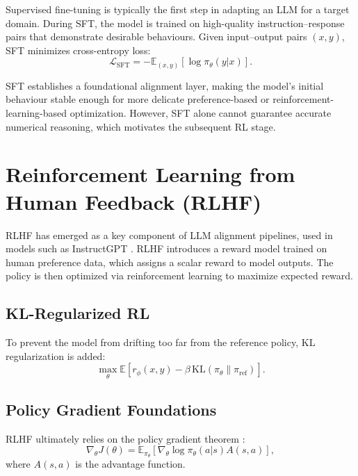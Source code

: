 \documentclass[12pt]{report}
\begin{document}
Supervised fine-tuning is typically the first step in adapting an LLM for a target domain. During SFT, the model is trained on high-quality instruction--response pairs that demonstrate desirable behaviours. Given input--output pairs $(x, y)$, SFT minimizes cross-entropy loss:
\begin{equation}
\mathcal{L}_{\text{SFT}} = -\mathbb{E}_{(x,y)}[\log\pi_{\theta}(y|x)].
\end{equation}

SFT establishes a foundational alignment layer, making the model's initial behaviour stable enough for more delicate preference-based or reinforcement-learning-based optimization. However, SFT alone cannot guarantee accurate numerical reasoning, which motivates the subsequent RL stage.

\section{Reinforcement Learning from Human Feedback (RLHF)}

RLHF has emerged as a key component of LLM alignment pipelines, used in models such as InstructGPT \citep{ouyang2022training}. RLHF introduces a reward model trained on human preference data, which assigns a scalar reward to model outputs. The policy is then optimized via reinforcement learning to maximize expected reward.

\subsection{KL-Regularized RL}

To prevent the model from drifting too far from the reference policy, KL regularization is added:
\begin{equation}
\max_{\theta} \mathbb{E}\left[r_{\phi}(x, y) - \beta \, \text{KL}(\pi_{\theta} \| \pi_{\text{ref}})\right].
\end{equation}

\subsection{Policy Gradient Foundations}

RLHF ultimately relies on the policy gradient theorem \citep{sutton1999policy}:
\begin{equation}
\nabla_{\theta}J(\theta) = \mathbb{E}_{\pi_{\theta}}[ \nabla_{\theta}\log\pi_{\theta}(a|s) A(s,a) ],
\end{equation}
where $A(s,a)$ is the advantage function.
\end{document}
